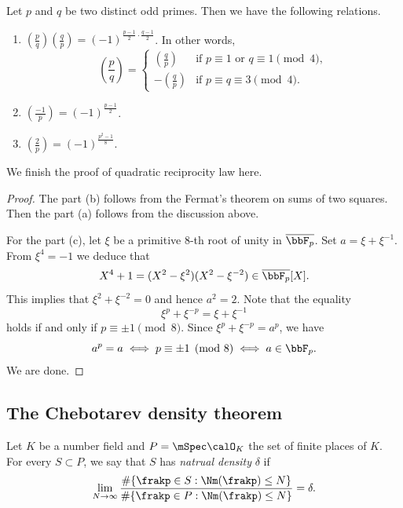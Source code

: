     \begin{theorem}\label{thm:quadratic_reciprocity_law}
        Let \(p\) and \(q\) be two distinct odd primes.
        Then we have the following relations.
        \begin{enumerate}
            \item \(\left(\frac{p}{q}\right) \left(\frac{q}{p}\right) = (-1)^{\frac{p-1}{2} \cdot \frac{q-1}{2}}\).
                In other words, 
                \[\left(\frac{p}{q}\right) = \begin{cases}
                    \left(\frac{q}{p}\right) & \text{if } p \equiv 1 \text{ or } q \equiv 1 \pmod{4}, \\
                    -\left(\frac{q}{p}\right) & \text{if } p \equiv q \equiv 3 \pmod{4}.
                \end{cases} \]
            \item \(\left(\frac{-1}{p}\right) = (-1)^{\frac{p-1}{2}}\).
            \item \(\left(\frac{2}{p}\right) = (-1)^{\frac{p^2-1}{8}}\).
        \end{enumerate}
    \end{theorem}
    We finish the proof of quadratic reciprocity law here.
    \begin{proof}
        The part (b) follows from the Fermat's theorem on sums of two squares.
        Then the part (a) follows from the discussion above.

        For the part (c), let \(\xi\) be a primitive \(8\)-th root of unity in \(\overline{\bbF_p}\).
        Set \(a = \xi + \xi^{-1}\).
        From \(\xi^4 = -1\) we deduce that
        \[ X^4+1 = (X^2 - \xi^2)(X^2 - \xi^{-2}) \in \overline{\bbF_p}[X]. \]
        This implies that \(\xi^2 + \xi^{-2} = 0\) and hence \(a^2 = 2\).
        Note that the equality
        \[ \xi^p + \xi^{-p} = \xi + \xi^{-1} \]
        holds if and only if \(p \equiv \pm 1 \pmod{8}\).
        Since \(\xi^p + \xi^{-p} = a^p\), we have 
        \[ a^p = a \iff p \equiv \pm 1 \pmod{8} \iff a \in \bbF_p. \]
        We are done.
    \end{proof}


\subsection{The Chebotarev density theorem}

    \begin{definition}
        Let \(K\) be a number field and \(P= \mSpec \calO_K\) the set of finite places of \(K\).
        For every \(S \subset P\), we say that \(S\) has \emph{natrual density} \(\delta\) if
        \[ \lim_{N \to \infty} \frac{\#\{\frakp \in S: \Nm(\frakp) \leq N\}}{\#\{\frakp \in P: \Nm(\frakp) \leq N\}} = \delta. \]
    \end{definition}

